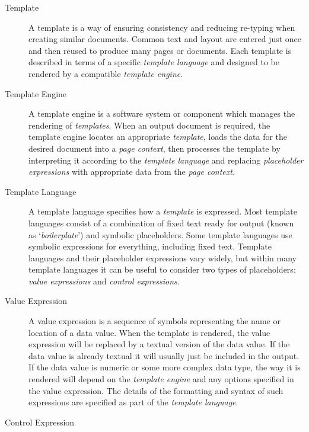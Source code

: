 \begin{description}
\item[Template] 

A template is a way of ensuring consistency and reducing re-typing when creating similar documents. Common text and layout are entered just once and then reused to produce many pages or documents. Each template is described in terms of a specific \emph{template language} and designed to be rendered by a compatible \emph{template engine}.

\item[Template Engine] 

A template engine is a software system or component which manages the rendering of \emph{templates}. When an output document is required, the template engine locates an appropriate \emph{template}, loads the data for the desired document into a \emph{page context}, then processes the template by interpreting it according to the \emph{template language} and replacing \emph{placeholder expressions} with appropriate data from the \emph{page context}. 

\item[Template Language] 

A template language specifies how a \emph{template} is expressed. Most template languages consist of a combination of fixed text ready for output (known as `\emph{boilerplate}') and symbolic placeholders. Some template languages use symbolic expressions for everything, including fixed text. Template languages and their placeholder expressions vary widely, but within many template languages it can be useful to consider two types of placeholders: \emph{value expressions} and \emph{control expressions}.

\item[Value Expression] 

A value expression is a sequence of symbols representing the name or location of a data value. When the template is rendered, the value expression will be replaced by a textual version of the data value. If the data value is already textual it will usually just be included in the output. If the data value is numeric or some more complex data type, the way it is rendered will depend on the \emph{template engine} and any options specified in the value expression. The details of the formatting and syntax of such expressions are specified as part of the \emph{template language}.

\item[Control Expression] 


\end{description}
